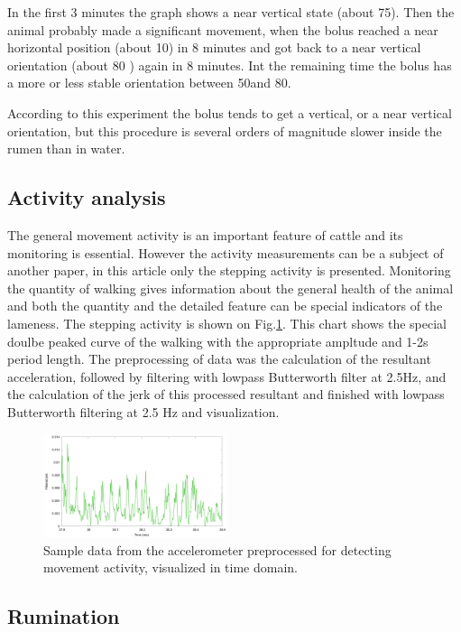 \documentclass[conference]{IEEEtran}
\begin{document}
In the first 3 minutes the graph shows a near vertical state (about
75\textdegree). Then the animal probably made a significant movement, when the
bolus reached a near horizontal position (about 10\textdegree) in 8 minutes and
got back to a near vertical orientation (about 80 \textdegree) again in 8
minutes. Int the remaining time the bolus has a more or less stable orientation
between 50\textdegree and 80\textdegree.

According to this experiment the bolus tends to get a vertical, or a near
vertical orientation, but this procedure is several orders of magnitude slower
inside the rumen than in water.

\subsection{Activity analysis}

The general movement activity is an important feature of cattle and its
monitoring  is essential. However the activity measurements can be a subject of
another paper, in this article only the stepping activity  is presented.
Monitoring the quantity of walking gives information about the general health
of the animal and both the quantity and the detailed feature can be special
indicators of the lameness. The stepping activity is shown on
Fig.\ref{walking}. This chart shows the special doulbe peaked curve of the
walking with the appropriate ampltude and 1-2s period length. The preprocessing
of data was the calculation of the resultant acceleration, followed by
filtering with lowpass Butterworth filter at 2.5Hz, and the calculation of the
jerk of this processed resultant and finished with lowpass Butterworth
filtering at 2.5 Hz and visualization.

\begin{figure}[htbp]
\centerline{\includegraphics[width=0.48\textwidth]{fig/plot_ker.png}}
  \caption{Sample data from the accelerometer preprocessed for detecting movement activity, visualized
  in time domain.}
\label{walking}
\end{figure}

\subsection{Rumination}
\end{document}
